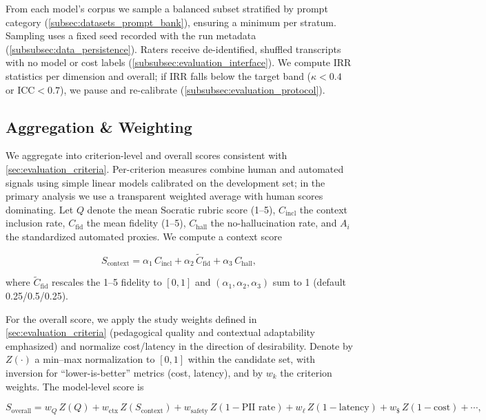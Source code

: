 From each model's corpus we sample a balanced subset stratified by prompt category (\cref{subsec:datasets_prompt_bank}), ensuring a minimum per stratum. Sampling uses a fixed seed recorded with the run metadata (\cref{subsubsec:data_persistence}). Raters receive de-identified, shuffled transcripts with no model or cost labels (\cref{subsubsec:evaluation_interface}). We compute IRR statistics per dimension and overall; if IRR falls below the target band ($\kappa<0.4$ or ICC$<0.7$), we pause and re-calibrate (\cref{subsubsec:evaluation_protocol}).

\subsection{Aggregation \& Weighting}\label{subsec:aggregation_weighting}

We aggregate into criterion-level and overall scores consistent with \cref{sec:evaluation_criteria}. Per-criterion measures combine human and automated signals using simple linear models calibrated on the development set; in the primary analysis we use a transparent weighted average with human scores dominating. Let $Q$ denote the mean Socratic rubric score (1--5), $C_{\text{incl}}$ the context inclusion rate, $C_{\text{fid}}$ the mean fidelity (1--5), $C_{\text{hall}}$ the no-hallucination rate, and $A_i$ the standardized automated proxies. We compute a context score

\begin{equation}
S_{\text{context}} = \alpha_1 \, C_{\text{incl}} + \alpha_2 \, \tilde{C}_{\text{fid}} + \alpha_3 \, C_{\text{hall}},
\label{eq:context_score}
\end{equation}

where $\tilde{C}_{\text{fid}}$ rescales the 1--5 fidelity to $[0,1]$ and $(\alpha_1,\alpha_2,\alpha_3)$ sum to 1 (default 0.25/0.5/0.25).

For the overall score, we apply the study weights defined in \cref{sec:evaluation_criteria} (pedagogical quality and contextual adaptability emphasized) and normalize cost/latency in the direction of desirability. Denote by $Z(\cdot)$ a min–max normalization to $[0,1]$ within the candidate set, with inversion for ``lower-is-better'' metrics (cost, latency), and by $w_k$ the criterion weights. The model-level score is

\begin{equation}
S_{\text{overall}} = w_Q \, Z(Q) + w_{\text{ctx}} \, Z(S_{\text{context}}) + w_{\text{safety}} \, Z(1-\text{PII rate}) + w_{\ell} \, Z(1-\text{latency}) + w_{\$} \, Z(1-\text{cost}) + \cdots,
\label{eq:overall_score}
\end{equation}

